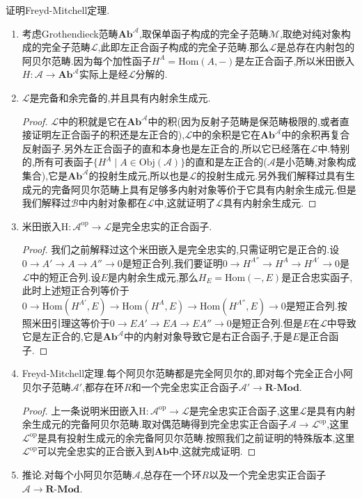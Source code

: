 证明Freyd-Mitchell定理.
\begin{enumerate}
	\item 考虑Grothendieck范畴$\textbf{Ab}^{\mathscr{A}}$,取保单函子构成的完全子范畴$\mathscr{M}$,取绝对纯对象构成的完全子范畴$\mathscr{L}$,此即左正合函子构成的完全子范畴.那么$\mathscr{L}$是总存在内射包的阿贝尔范畴.因为每个加性函子$H^A=\mathrm{Hom}(A,-)$是左正合函子,所以米田嵌入$H:\mathscr{A}\to\textbf{Ab}^{\mathscr{A}}$实际上是经$\mathscr{L}$分解的.
	\item $\mathscr{L}$是完备和余完备的,并且具有内射余生成元.
	\begin{proof}
		
		$\mathscr{L}$中的积就是它在$\textbf{Ab}^{\mathscr{A}}$中的积(因为反射子范畴是保范畴极限的,或者直接证明左正合函子的积还是左正合的),$\mathscr{L}$中的余积是它在$\textbf{Ab}^{\mathscr{A}}$中的余积再复合反射函子.另外左正合函子的直和本身也是左正合的,所以它已经落在$\mathscr{L}$中.特别的,所有可表函子$\{H^A\mid A\in\mathrm{Obj}(\mathscr{A})\}$的直和是左正合的($\mathscr{A}$是小范畴,对象构成集合),它是$\textbf{Ab}^{\mathscr{A}}$的投射生成元,所以也是$\mathscr{L}$的投射生成元.另外我们解释过具有生成元的完备阿贝尔范畴上具有足够多内射对象等价于它具有内射余生成元.但是我们解释过$\mathscr{B}$中内射对象都在$\mathscr{L}$中,这就证明了$\mathscr{L}$具有内射余生成元.
	\end{proof}
    \item 米田嵌入$\mathrm{H}:\mathscr{A}^{\mathrm{op}}\to\mathscr{L}$是完全忠实的正合函子.
    \begin{proof}
    	
    	我们之前解释过这个米田嵌入是完全忠实的,只需证明它是正合的.设$0\to A'\to A\to A''\to0$是短正合列,我们要证明$0\to H^{A''}\to H^A\to H^{A'}\to0$是$\mathscr{L}$中的短正合列.设$E$是内射余生成元,那么$H_E=\mathrm{Hom}(-,E)$是正合忠实函子,此时上述短正合列等价于$0\to\mathrm{Hom}(H^{A'},E)\to\mathrm{Hom}(H^{A},E)\to\mathrm{Hom}(H^{A''},E)\to0$是短正合列.按照米田引理这等价于$0\to EA'\to EA\to EA''\to0$是短正合列.但是$E$在$\mathscr{L}$中导致它是左正合的,它是$\textbf{Ab}^{\mathscr{A}}$中的内射对象导致它是右正合函子,于是$E$是正合函子.
    \end{proof}
    \item Freyd-Mitchell定理.每个阿贝尔范畴都是完全阿贝尔的,即对每个完全正合小阿贝尔子范畴$\mathscr{A}'$,都存在环$R$和一个完全忠实正合函子$\mathscr{A}'\to\textbf{R-Mod}$.
    \begin{proof}
    	
    	上一条说明米田嵌入$\mathrm{H}:\mathscr{A}^{\mathrm{op}}\to\mathscr{L}$是完全忠实正合函子,这里$\mathscr{L}$是具有内射余生成元的完备阿贝尔范畴.取对偶范畴得到完全忠实正合函子$\mathscr{A}\to\mathscr{L}^{\mathrm{op}}$,这里$\mathscr{L}^{\mathrm{op}}$是具有投射生成元的余完备阿贝尔范畴.按照我们之前证明的特殊版本,这里$\mathscr{L}^{\mathrm{op}}$可以完全忠实的正合嵌入到$\textbf{Ab}$中,这就完成证明.
    \end{proof}
    \item 推论.对每个小阿贝尔范畴$\mathscr{A}$,总存在一个环$R$以及一个完全忠实正合函子$\mathscr{A}\to\textbf{R-Mod}$.
\end{enumerate}
\newpage
